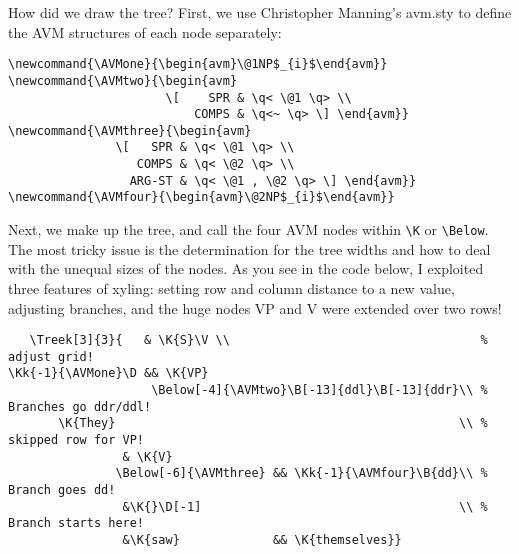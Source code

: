\documentclass[12pt,a4paper]{article}
\begin{document}

How did we draw the tree? First, we use Christopher Manning's avm.sty to define the AVM
structures of each node separately:

\begin{verbatim}
\newcommand{\AVMone}{\begin{avm}\@1NP$_{i}$\end{avm}}
\newcommand{\AVMtwo}{\begin{avm} 
                      \[    SPR & \q< \@1 \q> \\ 
                          COMPS & \q<~ \q> \] \end{avm}}
\newcommand{\AVMthree}{\begin{avm} 
               \[   SPR & \q< \@1 \q> \\ 
                  COMPS & \q< \@2 \q> \\
                 ARG-ST & \q< \@1 , \@2 \q> \] \end{avm}} 
\newcommand{\AVMfour}{\begin{avm}\@2NP$_{i}$\end{avm}}
\end{verbatim}

Next, we make up the tree, and call the four AVM nodes within \verb|\K| or
\verb|\Below|. The most tricky issue is the determination for the tree widths and how to
deal with the unequal sizes of the nodes. As you see in the code below, I exploited
three features of xyling: setting row and column distance to a new value, adjusting
branches, and the huge nodes VP and V were extended over two rows!

\footnotesize
\begin{verbatim}
   \Treek[3]{3}{   & \K{S}\V \\                                   % adjust grid!
\Kk{-1}{\AVMone}\D && \K{VP}
                    \Below[-4]{\AVMtwo}\B[-13]{ddl}\B[-13]{ddr}\\ % Branches go ddr/ddl!
       \K{They}                                                \\ % skipped row for VP!
                & \K{V} 
               \Below[-6]{\AVMthree} && \Kk{-1}{\AVMfour}\B{dd}\\ % Branch goes dd!
                &\K{}\D[-1]                                    \\ % Branch starts here!
                &\K{saw}             && \K{themselves}}

\end{verbatim}
\normalsize
\end{document}
